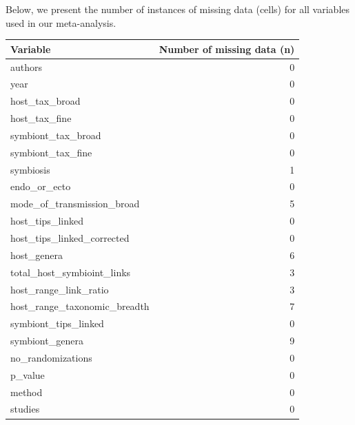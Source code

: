 \documentclass[
]{article}
\newenvironment{Shaded}{\begin{snugshade}}{\end{snugshade}}
\newcommand{\CommentTok}[1]{\textcolor[rgb]{0.56,0.35,0.01}{\textit{#1}}}
\newcommand{\DataTypeTok}[1]{\textcolor[rgb]{0.13,0.29,0.53}{#1}}
\newcommand{\KeywordTok}[1]{\textcolor[rgb]{0.13,0.29,0.53}{\textbf{#1}}}
\newcommand{\NormalTok}[1]{#1}
\newcommand{\OperatorTok}[1]{\textcolor[rgb]{0.81,0.36,0.00}{\textbf{#1}}}
\newcommand{\StringTok}[1]{\textcolor[rgb]{0.31,0.60,0.02}{#1}}
\begin{document}
Below, we present the number of instances of missing data (cells) for
all variables used in our meta-analysis.

\begin{Shaded}
\end{Shaded}

\begin{tabular}{l|r}
\hline
Variable & Number of missing data (n)\\
\hline
authors & 0\\
\hline
year & 0\\
\hline
host\_tax\_broad & 0\\
\hline
host\_tax\_fine & 0\\
\hline
symbiont\_tax\_broad & 0\\
\hline
symbiont\_tax\_fine & 0\\
\hline
symbiosis & 1\\
\hline
endo\_or\_ecto & 0\\
\hline
mode\_of\_transmission\_broad & 5\\
\hline
host\_tips\_linked & 0\\
\hline
host\_tips\_linked\_corrected & 0\\
\hline
host\_genera & 6\\
\hline
total\_host\_symbioint\_links & 3\\
\hline
host\_range\_link\_ratio & 3\\
\hline
host\_range\_taxonomic\_breadth & 7\\
\hline
symbiont\_tips\_linked & 0\\
\hline
symbiont\_genera & 9\\
\hline
no\_randomizations & 0\\
\hline
p\_value & 0\\
\hline
method & 0\\
\hline
studies & 0\\
\hline
\end{tabular}
\end{document}
